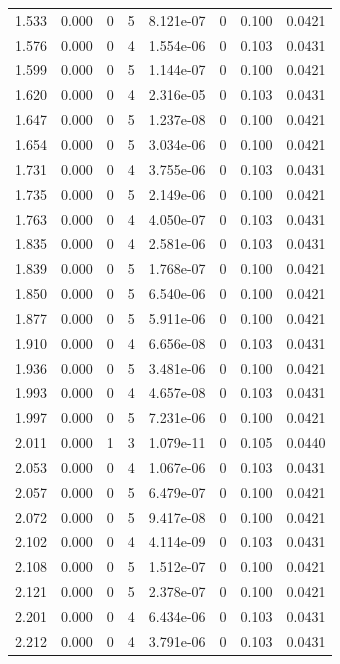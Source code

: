 \documentclass[preview]{standalone}
\begin{document}
{{{\begin{tabular}{L{1.2cm}C{1.2cm} C{0.3cm}C{0.5cm} C{1.4cm}C{1.4cm} C{1.4cm}C{1.4cm}}
  1.533  &  0.000  & 0     &  5 &  8.121e-07  & 0  & 0.100 &  0.0421   \\ 
  1.576  &  0.000  & 0     &  4 &  1.554e-06  & 0  & 0.103 &  0.0431   \\ 
  1.599  &  0.000  & 0     &  5 &  1.144e-07  & 0  & 0.100 &  0.0421   \\ 
  1.620  &  0.000  & 0     &  4 &  2.316e-05  & 0  & 0.103 &  0.0431   \\ 
  1.647  &  0.000  & 0     &  5 &  1.237e-08  & 0  & 0.100 &  0.0421   \\ 
  1.654  &  0.000  & 0     &  5 &  3.034e-06  & 0  & 0.100 &  0.0421   \\ 
  1.731  &  0.000  & 0     &  4 &  3.755e-06  & 0  & 0.103 &  0.0431   \\ 
  1.735  &  0.000  & 0     &  5 &  2.149e-06  & 0  & 0.100 &  0.0421   \\ 
  1.763  &  0.000  & 0     &  4 &  4.050e-07  & 0  & 0.103 &  0.0431   \\ 
  1.835  &  0.000  & 0     &  4 &  2.581e-06  & 0  & 0.103 &  0.0431   \\ 
  1.839  &  0.000  & 0     &  5 &  1.768e-07  & 0  & 0.100 &  0.0421   \\ 
  1.850  &  0.000  & 0     &  5 &  6.540e-06  & 0  & 0.100 &  0.0421   \\ 
  1.877  &  0.000  & 0     &  5 &  5.911e-06  & 0  & 0.100 &  0.0421   \\ 
  1.910  &  0.000  & 0     &  4 &  6.656e-08  & 0  & 0.103 &  0.0431   \\ 
  1.936  &  0.000  & 0     &  5 &  3.481e-06  & 0  & 0.100 &  0.0421   \\ 
  1.993  &  0.000  & 0     &  4 &  4.657e-08  & 0  & 0.103 &  0.0431   \\ 
  1.997  &  0.000  & 0     &  5 &  7.231e-06  & 0  & 0.100 &  0.0421   \\ 
  2.011  &  0.000  & 1     &  3 &  1.079e-11  & 0  & 0.105 &  0.0440   \\ 
  2.053  &  0.000  & 0     &  4 &  1.067e-06  & 0  & 0.103 &  0.0431   \\ 
  2.057  &  0.000  & 0     &  5 &  6.479e-07  & 0  & 0.100 &  0.0421   \\ 
  2.072  &  0.000  & 0     &  5 &  9.417e-08  & 0  & 0.100 &  0.0421   \\ 
  2.102  &  0.000  & 0     &  4 &  4.114e-09  & 0  & 0.103 &  0.0431   \\ 
  2.108  &  0.000  & 0     &  5 &  1.512e-07  & 0  & 0.100 &  0.0421   \\ 
  2.121  &  0.000  & 0     &  5 &  2.378e-07  & 0  & 0.100 &  0.0421   \\ 
  2.201  &  0.000  & 0     &  4 &  6.434e-06  & 0  & 0.103 &  0.0431   \\ 
  2.212  &  0.000  & 0     &  4 &  3.791e-06  & 0  & 0.103 &  0.0431   \\ 
\hline 
\end{tabular} 

}}}
\end{document}
